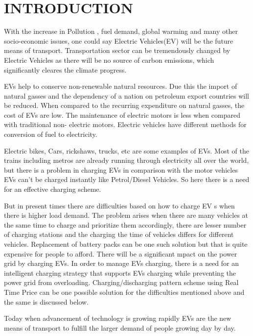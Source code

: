 	\chapter{INTRODUCTION}
	\label{chap:intro}
	
	
	With the increase in Pollution , fuel demand, global warming and many other socio-economic issues, one could say Electric Vehicles(EV) will be the future means of transport. Transportation sector can be tremendously changed by Electric Vehicles as there will be no source of carbon emissions, which significantly cleares the climate progress. 
	
	\noindent EVs help to conserve non-renewable natural resources. Due
	this the import of natural gasses and the dependency of a nation on petroleum export countries
	will be reduced. When compared to the recurring expenditure on natural gasses, the cost of
	EVs are low. The maintenance of electric motors is less when compared with traditional non-
	electric motors. Electric vehicles have different methods for conversion of fuel to electricity.
	
	
	
	\noindent Electric bikes, Cars, rickshaws, trucks, etc are some examples of EVs. Most of the trains including metros are already running through electricity all over the world, but there is a problem in charging EVs in comparison with the motor vehicles EVs can't be charged instantly like Petrol/Diesel Vehicles. 
	So here there is a need for an effective charging scheme.
	
	\noindent But in present times there are difficulties based on how to charge EV s when there is higher
	load demand. The problem arises when there are many vehicles at the same time to charge
	and prioritize them accordingly, there are lesser number of charging stations and the charging
	the time of vehicles differs for different vehicles. Replacement of battery packs can be one such
	solution but that is quite expensive for people to afford. There will be a significant mpact on the power grid by charging EVs. In order to manage EVs charging, there is a need for an intelligent
	charging strategy that supports EVs charging while preventing the power grid from
	overloading. Charging/discharging pattern scheme using Real Time Price can be one possible
	solution for the difficulties mentioned above and the same is discussed below.
	
	\noindent Today when advancement of technology is growing rapidly EVs are the new means of transport to fulfill the larger demand of people growing day by day.
	
